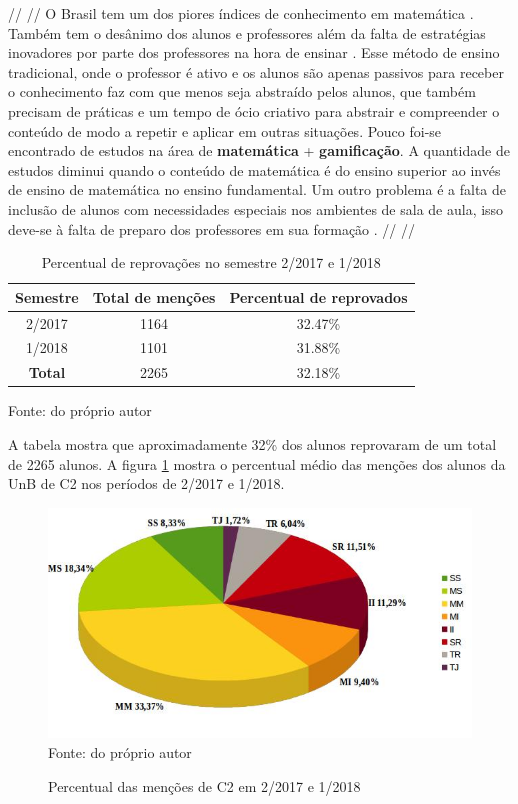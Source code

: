 // //
O Brasil tem um dos piores índices de conhecimento em matemática \cite{indiceRuimMat}. Também tem o desânimo dos alunos e professores além da falta de estratégias inovadores por parte dos professores na hora de ensinar \cite{softwaregamificado}. Esse método de ensino tradicional, onde o professor é ativo e os alunos são apenas passivos para receber o conhecimento faz com que menos seja abstraído pelos alunos, que também precisam de práticas e um tempo de ócio criativo para abstrair e compreender o conteúdo de modo a repetir e aplicar em outras situações. Pouco foi-se encontrado de estudos na área de \textbf{matemática} + \textbf{gamificação}. A quantidade de estudos diminui quando o conteúdo de matemática é do ensino superior ao invés de ensino de matemática no ensino fundamental. 
Um outro problema é a falta de inclusão de alunos com necessidades especiais nos ambientes de sala de aula, isso deve-se à falta de preparo dos professores em sua formação \cite{matEtdah}.
// //

\begin{table}[H]
\centering
\caption{Percentual de reprovações no semestre 2/2017 e 1/2018}
\begin{tabular}{|c|c|c|}
\hline
Semestre & Total de menções & Percentual de reprovados \\ 
\toprule
2/2017 & 1164 & 32.47\% \\ 
1/2018 & 1101 & 31.88\% \\
\textbf{Total} & 2265 & 32.18\% \\
\hline
\end{tabular}
\label{tabelareprovacaoC2}
\small{Fonte: do próprio autor}
\end{table} 

A tabela mostra que aproximadamente 32\% dos alunos reprovaram de um total de 2265 alunos. 
A figura \ref{figuramencao} mostra o percentual médio das menções dos alunos da UnB de C2 nos períodos de 2/2017 e 1/2018.

\begin{figure}[H]
\centering
\caption{Percentual das menções de C2 em 2/2017 e 1/2018}
\includegraphics[scale=0.72]{figuras/grafico_media.jpg}
\label{figuramencao}
\small{Fonte: do próprio autor}
\end{figure}

